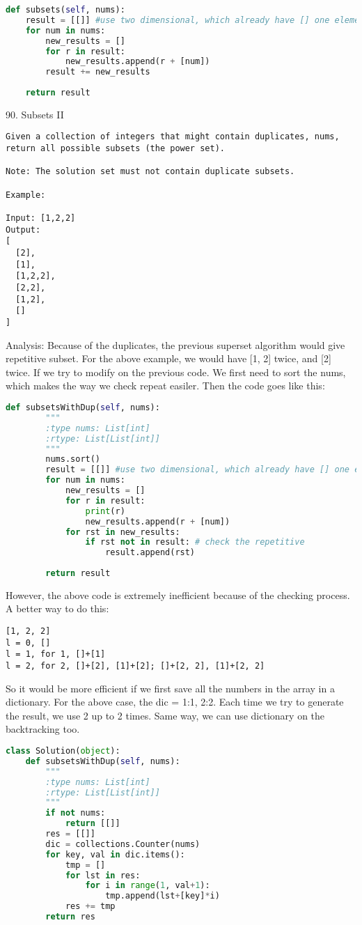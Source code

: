 \documentclass[../../question_3_array_question.tex]{subfiles}
\begin{document}
\begin{lstlisting}[language=Python]
def subsets(self, nums):
    result = [[]] #use two dimensional, which already have [] one element
    for num in nums:
        new_results = []
        for r in result:
            new_results.append(r + [num])
        result += new_results
        
    return result
\end{lstlisting}
90. Subsets II
\begin{lstlisting}
Given a collection of integers that might contain duplicates, nums, return all possible subsets (the power set).

Note: The solution set must not contain duplicate subsets.

Example:

Input: [1,2,2]
Output:
[
  [2],
  [1],
  [1,2,2],
  [2,2],
  [1,2],
  []
]
\end{lstlisting}
Analysis: Because of the duplicates, the previous superset algorithm would give repetitive subset. For the above example, we would have [1, 2] twice, and [2] twice.  If we try to modify on the previous code. We first need to sort the nums, which makes the way we check repeat easiler. Then the code goes like this:
\begin{lstlisting}[language = Python]
    def subsetsWithDup(self, nums):
        """
        :type nums: List[int]
        :rtype: List[List[int]]
        """
        nums.sort()
        result = [[]] #use two dimensional, which already have [] one element
        for num in nums:
            new_results = []
            for r in result:
                print(r)
                new_results.append(r + [num])
            for rst in new_results:
                if rst not in result: # check the repetitive
                    result.append(rst)
            
        return result
\end{lstlisting}
However, the above code is extremely inefficient because of the checking process. A better way to do this:
\begin{lstlisting}
[1, 2, 2]
l = 0, []
l = 1, for 1, []+[1]
l = 2, for 2, []+[2], [1]+[2]; []+[2, 2], [1]+[2, 2]
\end{lstlisting}
So it would be more efficient if we first save all the numbers in the array in a dictionary. For the above case, the dic = {1:1, 2:2}. Each time we try to generate the result, we use 2 up to 2 times. Same way, we can use dictionary on the backtracking too. 
\begin{lstlisting}[language=Python]
class Solution(object):
    def subsetsWithDup(self, nums):
        """
        :type nums: List[int]
        :rtype: List[List[int]]
        """
        if not nums:
            return [[]]
        res = [[]]
        dic = collections.Counter(nums)
        for key, val in dic.items():
            tmp = []
            for lst in res:
                for i in range(1, val+1):
                    tmp.append(lst+[key]*i)
            res += tmp
        return res
\end{lstlisting}
\end{document}
